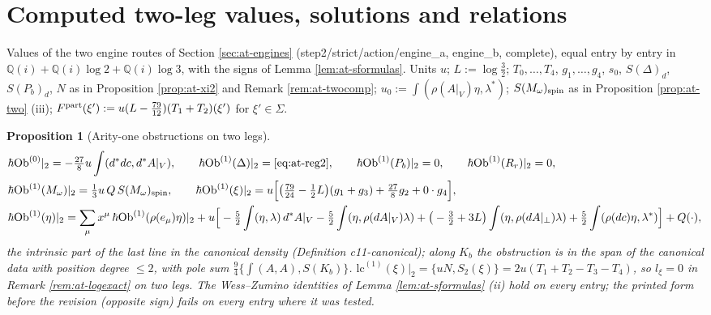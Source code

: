 \documentclass[11pt]{article}
\numberwithin{equation}{section}
\theoremstyle{plain}
\newtheorem{proposition}[theorem]{Proposition}
\theoremstyle{definition}
\newcommand{\Ap}{A|_{\perp}}
\newcommand{\AV}{A|_V}
\newcommand{\Ob}{\mathrm{Ob}}
\newcommand{\lc}{\mathrm{lc}}
\begin{document}
\section{Computed two-leg values, solutions and relations}
\label{sec:at-computed}

Values of the two engine routes of Section \ref{sec:at-engines} (step2/strict/action/engine\_a, engine\_b, complete), equal entry by entry in $\mathbb Q(i)+\mathbb Q(i)\log2+\mathbb Q(i)\log3$, with the signs of Lemma \ref{lem:at-sformulas}. Units $u$; $L:=\log\tfrac32$; $T_0,\dots,T_4$, $g_1,\dots,g_4$, $s_0$, $S(\Delta)_d$, $S(P_b)_d$, $N$ as in Proposition \ref{prop:at-xi2} and Remark \ref{rem:at-twocomp}; $u_0:=\int(\rho(\AV)\eta,\lambda^*)$; $S(M_\omega)_{\rm spin}$ as in Proposition \ref{prop:at-two} (iii); $F^{\rm part}(\xi'):=u(L-\tfrac{79}{12})(T_1+T_2)(\xi')$ for $\xi'\in\Sigma$.

\begin{proposition}[Arity-one obstructions on two legs]
\label{prop:at-c-ob1}
\[
\begin{aligned}
&\hbar\Ob^{(0)}|_2=-\tfrac{27}8u\int(d^*dc,d^*\AV),\qquad \hbar\Ob^{(1)}(\Delta)|_2=\eqref{eq:at-reg2},\qquad \hbar\Ob^{(1)}(P_b)|_2=0,\qquad \hbar\Ob^{(1)}(R_r)|_2=0,\\
&\hbar\Ob^{(1)}(M_\omega)|_2=\tfrac13u\,Q\,S(M_\omega)_{\rm spin},\qquad \hbar\Ob^{(1)}(\xi)|_2=u\Big[\big(\tfrac{79}{24}-\tfrac12L\big)(g_1+g_3)+\tfrac{27}8g_2+0\cdot g_4\Big],\\
&\hbar\Ob^{(1)}(\eta)|_2=\sum_\mu x^\mu\,\hbar\Ob^{(1)}(\rho(e_\mu)\eta)|_2+u\Big[-\tfrac52\int(\eta,\lambda)\,d^*\AV-\tfrac52\int(\eta,\rho(d\AV)\lambda)+\big(-\tfrac32+3L\big)\int(\eta,\rho(d\Ap)\lambda)+\tfrac52\int(\rho(dc)\eta,\lambda^*)\Big]+Q(\cdot),
\end{aligned}
\]
the intrinsic part of the last line in the canonical density (Definition c11-canonical); along $K_b$ the obstruction is in the span of the canonical data with position degree $\le2$, with pole sum $\tfrac94\{\int(A,A),S(K_b)\}$. $\lc^{(1)}(\xi)|_2=\{uN,S_2(\xi)\}=2u(T_1+T_2-T_3-T_4)$, so $l_\xi=0$ in Remark \ref{rem:at-logexact} on two legs. The Wess--Zumino identities of Lemma \ref{lem:at-sformulas} (ii) hold on every entry; the printed form before the revision (opposite sign) fails on every entry where it was tested.
\end{proposition}
\end{document}
